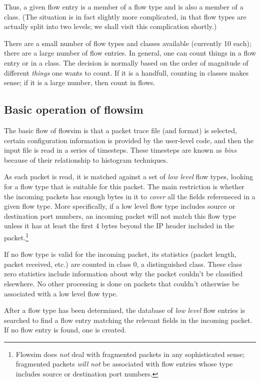 \documentclass{article}
\begin{document}
Thus, a given flow entry is a member of a flow type and is also a
member of a class.  (The situation is in fact slightly more
complicated, in that flow types are actually split into two levels; we
shall visit this complication shortly.)

There are a small number of flow types and classes available (currently
10 each); there are a large number of flow entries.  In general, one
can count things in a flow entry or in a class.  The decision is
normally based on the order of magnitude of different \emph{things} one
wants to count.  If it is a handfull, counting in classes makes sense;
if it is a large number, then count in flows.
\subsection{Basic operation of flowsim}

The basic flow of flowsim is that a packet trace file (and format) is
selected, certain configuration information is provided by the
user-level code, and
then the input file is read in a series of timesteps.  These
timesteps are known as \emph{bins} because of their relationship to
histogram techniques.

As each packet is read, it is matched against a set of \emph{low level}
flow types, looking for a flow type that is suitable for this packet.
The main restriction is whether the incoming packets has enough bytes
in it to \emph{cover} all the fields refereneced in a given flow type.
More specifically, if a low level flow type includes source or
destination port numbers, an incoming packet will not match this flow
type unless it has at least the first 4 bytes beyond the IP header
included in the packet.\footnote{
Flowsim does \emph{not} deal with fragmented packets in any
sophisticated sense; fragmented packets \emph{will not} be associated
with flow entries whose type includes source or destination port
numbers.}

If no flow type is valid for the incoming packet, its statistics
(packet length, packet received, etc.) are counted in class 0, a
distinguished class.  These class zero statistics include information
about why the packet couldn't be classified elsewhere.  No other
processing is done on packets that couldn't otherwise be associated
with a low level flow type.

After a flow type has been determined, the database of \emph{low level}
flow entries is searched to find a flow entry matching the relevant
fields in the incoming packet.  If no flow entry is found, one is
created.
\end{document}
